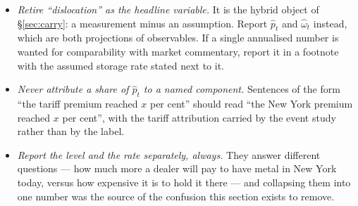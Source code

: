 \documentclass[11pt,a4paper]{article}
\newcommand{\phat}{\widehat{p}_t}
\newcommand{\omhat}{\widehat{\omega}_t}
\begin{document}
\begin{itemize}[leftmargin=1.2em,itemsep=3pt,topsep=2pt]
\item \emph{Retire ``dislocation'' as the headline variable.} It is the hybrid
object of \S\ref{sec:carry}: a measurement minus an assumption. Report $\phat$
and $\omhat$ instead, which are both projections of observables. If a single
annualised number is wanted for comparability with market commentary, report it
in a footnote with the assumed storage rate stated next to it.
\item \emph{Never attribute a share of $\phat$ to a named component.}
Sentences of the form ``the tariff premium reached $x$ per cent'' should read
``the New York premium reached $x$ per cent'', with the tariff attribution
carried by the event study rather than by the label.
\item \emph{Report the level and the rate separately, always.} They answer
different questions --- how much more a dealer will pay to have metal in New
York today, versus how expensive it is to hold it there --- and collapsing them
into one number was the source of the confusion this section exists to remove.
\end{itemize}
\end{document}
